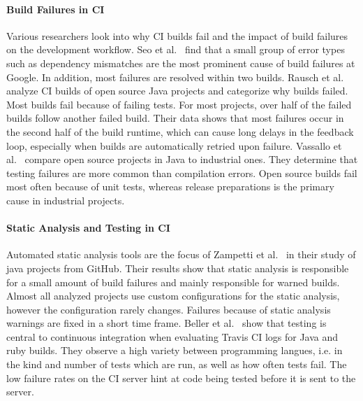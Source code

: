 \documentclass[\myrootdir/main.tex]{subfiles}
\begin{document}
\paragraph{Build Failures in CI}
Various researchers look into why CI builds fail and the impact of build failures on the development workflow.
Seo et al.~\cite{seo2014programmers} find that a small group of error types such as dependency mismatches are the most prominent cause of build failures at Google.
In addition, most failures are resolved within two builds.
Rausch et al.~\cite{rausch2017empirical} analyze CI builds of open source Java projects and categorize why builds failed.
Most builds fail because of failing tests.
For most projects, over half of the failed builds follow another failed build.
Their data shows that most failures occur in the second half of the build runtime, which can cause long delays in the feedback loop, especially when builds are automatically retried upon failure.
Vassallo et al.~\cite{vassallo2017a-tale} compare open source projects in Java to industrial ones.
They determine that testing failures are more common than compilation errors.
Open source builds fail most often because of unit tests, whereas release preparations is the primary cause in industrial projects.

\paragraph{Static Analysis and Testing in CI}
Automated static analysis tools are the focus of Zampetti et al.~\cite{zampetti2017open} in their study of java projects from GitHub.
Their results show that static analysis is responsible for a small amount of build failures and mainly responsible for warned builds.
Almost all analyzed projects use custom configurations for the static analysis, however the configuration rarely changes.
Failures because of static analysis warnings are fixed in a short time frame.
Beller et al.~\cite{beller2017oops} show that testing is central to continuous integration when evaluating Travis CI logs for Java and ruby builds.
They observe a high variety between programming langues, i.e. in the kind and number of tests which are run, as well as how often tests fail.
The low failure rates on the CI server hint at code being tested before it is sent to the server.
\end{document}
